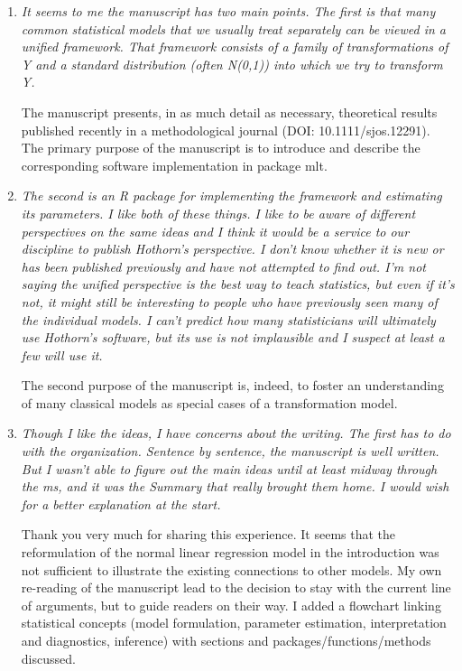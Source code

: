 \documentclass[12pt]{article}
\begin{document}
\begin{enumerate}

\item \textit{It seems to me the manuscript has two main points.  The first
is that many common statistical models that we usually treat separately can
be viewed in a unified framework.  That framework consists of a family of
transformations of Y and a standard distribution (often N(0,1)) into which
we try to transform Y.}

The manuscript presents, in as much detail as necessary, theoretical results
published recently in a methodological journal (DOI: 10.1111/sjos.12291).
The primary purpose of the manuscript is to introduce and describe the
corresponding software implementation in package mlt.

\item \textit{ The second is an R package for implementing the
framework and estimating its parameters.  I like both of these things.  I
like to be aware of different perspectives on the same ideas and I think it
would be a service to our discipline to publish Hothorn’s perspective.  I
don’t know whether it is new or has been published previously and have not
attempted to find out.  I’m not saying the unified perspective is the best
way to teach statistics, but even if it’s not, it might still be interesting
to people who have previously seen many of the individual models.  I can’t
predict how many statisticians will ultimately use Hothorn’s software, but
its use is not implausible and I suspect at least a few will use it.}

The second purpose of the manuscript is, indeed, to foster an understanding
of many classical models as special cases of a transformation model.

\item \textit{Though I like the ideas, I have concerns about the writing. 
The first has to do with the organization.  Sentence by sentence, the
manuscript is well written.  But I wasn’t able to figure out the main ideas
until at least midway through the ms, and it was the Summary that really
brought them home. I would wish for a better explanation at the start.}

Thank you very much for sharing this experience. It seems that the
reformulation of the normal linear regression model in the introduction was
not sufficient to illustrate the existing connections to other models. My
own re-reading of the manuscript lead to the decision to stay with the
current line of arguments, but to guide readers on their way. I added a
flowchart linking statistical concepts (model formulation, parameter
estimation, interpretation and diagnostics, inference) with sections and
packages/functions/methods discussed.


\end{enumerate}
\end{document}
